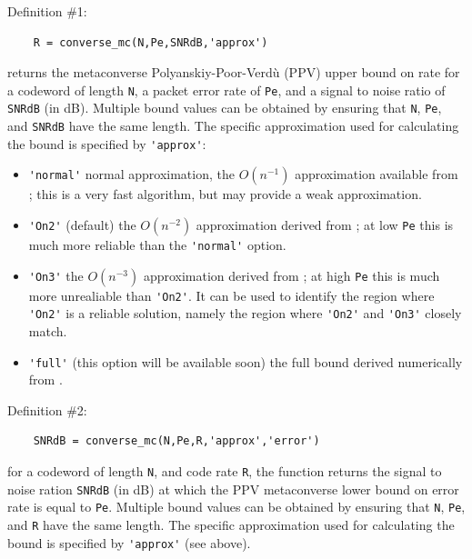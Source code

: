 \documentclass[a4paper,11p]{memoir}
\begin{document}
Definition \#1:
\begin{verbatim}
	R = converse_mc(N,Pe,SNRdB,'approx')
\end{verbatim}

\noindent returns the metaconverse Polyanskiy-Poor-Verd\`u (PPV) upper bound on rate for a codeword of length \verb|N|, a packet error rate of \verb|Pe|, and a signal to noise ratio of \verb|SNRdB| (in dB). Multiple bound values can be obtained by ensuring that \verb|N|, \verb|Pe|, and \verb|SNRdB| have the same length. The specific approximation used for calculating the bound is specified by \verb|'approx'|:
\begin{itemize}
\item \verb|'normal'| normal approximation, the  $O(n^{-1})$ approximation available from \cite[Fig.~6, 3rd block]{erseghe2015coding}; this is a
               very fast algorithm, but may provide a weak approximation.
\item \verb|'On2'| (default) the $O(n^{-2})$ approximation derived from \cite[Fig.~6, 2nd block]{erseghe2015coding};  at low \verb|Pe| this
is much more reliable  than the \verb|'normal'| option.
\item \verb|'On3'|  the $O(n^{-3})$ approximation derived from \cite[Fig.~6, 2nd block]{erseghe2015coding}; at high \verb|Pe| this is much more unrealiable than \verb|'On2'|. 
               It can  be used to identify the region where \verb|'On2'| is a 
               reliable solution, namely the region where \verb|'On2'| and \verb|'On3'| 
               closely match.
\item \verb|'full'| (this option will be available soon) the full bound derived
               numerically from \cite[Fig.~6, 1st block]{erseghe2015coding}.
\end{itemize}

\vspace*{5mm}

\noindent Definition \#2:
\begin{verbatim}
	SNRdB = converse_mc(N,Pe,R,'approx','error')
\end{verbatim}

\noindent for a codeword of length  \verb|N|, and code rate \verb|R|, the function returns the signal to noise ration \verb|SNRdB| (in dB) at which the PPV metaconverse lower bound on error rate is equal to \verb|Pe|. Multiple bound values can be 
 obtained by ensuring that \verb|N|, \verb|Pe|, and \verb|R| have the same length. The specific
 approximation used for calculating the bound is specified by \verb|'approx'| (see above).
\end{document}
